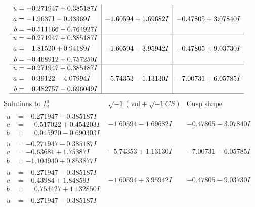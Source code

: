 \documentclass[1p]{elsarticle_modified}
\theoremstyle{definition}
\newcommand{\I}{\sqrt{-1}}
\begin{document}
$$\begin{array}{c|c|c}
\begin{aligned}
u &= -0.271947 + 0.385187 I \\
a &= -1.96371 - 0.33369 I \\
b &= -0.511166 - 0.764927 I\end{aligned}
 & -1.60594 + 1.69682 I & -0.47805 + 3.07840 I \\ \hline\begin{aligned}
u &= -0.271947 + 0.385187 I \\
a &= \phantom{-}1.81520 + 0.94189 I \\
b &= -0.468912 + 0.757250 I\end{aligned}
 & -1.60594 - 3.95942 I & -0.47805 + 9.03730 I \\ \hline\begin{aligned}
u &= -0.271947 + 0.385187 I \\
a &= \phantom{-}0.39122 - 4.07994 I \\
b &= \phantom{-}0.482757 - 0.696049 I\end{aligned}
 & -5.74353 - 1.13130 I & -7.00731 + 6.05785 I\\
 \hline 
 \end{array}$$\newpage$$\begin{array}{c|c|c}  
\text{Solutions to }I^u_{2}& \I (\text{vol} + \sqrt{-1}CS) & \text{Cusp shape}\\
 \hline 
\begin{aligned}
u &= -0.271947 - 0.385187 I \\
a &= \phantom{-}0.517022 + 0.454203 I \\
b &= \phantom{-}0.045920 - 0.690303 I\end{aligned}
 & -1.60594 - 1.69682 I & -0.47805 - 3.07840 I \\ \hline\begin{aligned}
u &= -0.271947 - 0.385187 I \\
a &= -0.63681 + 1.75387 I \\
b &= -1.104940 + 0.853877 I\end{aligned}
 & -5.74353 + 1.13130 I & -7.00731 - 6.05785 I \\ \hline\begin{aligned}
u &= -0.271947 - 0.385187 I \\
a &= -0.43984 + 1.84859 I \\
b &= \phantom{-}0.753427 + 1.132850 I\end{aligned}
 & -1.60594 + 3.95942 I & -0.47805 - 9.03730 I \\ \hline\begin{aligned}
u &= -0.271947 - 0.385187 I \\

\end{aligned}
\end{array}$$
\end{document}
